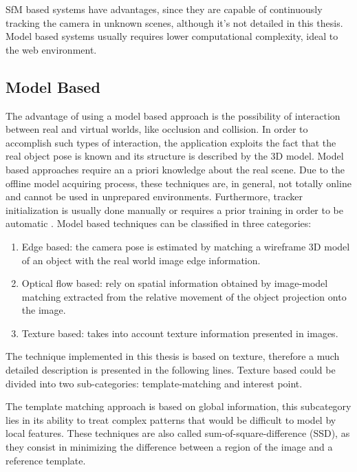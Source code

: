 SfM based systems have advantages, since they are capable of continuously tracking the camera in unknown scenes, although it's not detailed in this thesis. Model based systems usually requires lower computational complexity, ideal to the web environment.


\subsection{Model Based} %
\label{sub:basic_concepts:markerless_tracking_technique:model_based}

The advantage of using a model based approach is the possibility of interaction between real and virtual worlds, like occlusion and collision. In order to accomplish such types of interaction, the application exploits the fact that the real object pose is known and its structure is described by the 3D model. Model based approaches require an a priori knowledge about the real scene. Due to the offline model acquiring process, these techniques are, in general, not totally online and cannot be used in unprepared environments. Furthermore, tracker initialization is usually done manually or requires a prior training in order to be automatic \cite{Teichrieb2007}. Model based techniques can be classified in three categories:

\begin{enumerate}
  \item Edge based: the camera pose is estimated by matching a wireframe 3D model of an object with the real world image edge information.
  \item Optical flow based: rely on spatial information obtained by image-model matching extracted from the relative movement of the object projection onto the image.
  \item Texture based: takes into account texture information presented in images.
\end{enumerate}

The technique implemented in this thesis is based on texture, therefore a much detailed description is presented in the following lines. Texture based could be divided into two sub-categories: template-matching and interest point.

The template matching approach is based on global information, this subcategory lies in its ability to treat complex patterns that would be difficult to model by local features. These techniques are also called sum-of-square-difference (SSD), as they consist in minimizing the difference between a region of the image and a reference template.


